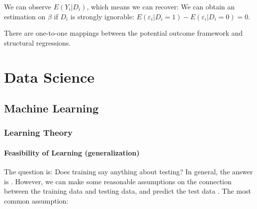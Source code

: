 \documentclass[10pt]{report}
\begin{document}
We can observe $E(Y_i|D_i)$, which means we can recover:
We can obtain an estimation on $\beta$ if $D_i$ is strongly ignorable: $E(\varepsilon_{i} | D_{i} = 1)-E(\varepsilon_{i} | D_{i} = 0)=0$. 
\begin{center}
    There are one-to-one mappings between the potential outcome framework and structural regressions.
\end{center}

\clearpage
\chapter{Data Science}

\section{Machine Learning}

\subsection{Learning Theory}

\subsubsection{Feasibility of Learning (generalization)}

The question is: Does training say anything about testing? In general, the answer is . However, we can make some reasonable assumptions on the connection between the training data and testing data, and predict the test data . The most common assumption:


\end{document}
